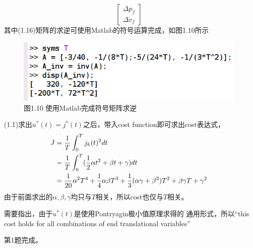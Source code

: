\documentclass[40pt,a4paper,UTF8]{ctexart}
\numberwithin{equation}{section}
\begin{document}
\begin{enumerate}
\begin{enumerate}
\begin{equation}
    \begin{bmatrix}
        \Delta p_f \\ \Delta v_f
    \end{bmatrix}
\end{equation}
其中(1.16)矩阵的求逆可使用Matlab的符号运算完成，如图1.10所示
\begin{figure}[H]
    \centering
    \includegraphics[width=4.8in]{ch4_10.png} {图1.10 使用Matlab完成符号矩阵求逆}
\end{figure}
\end{enumerate}

(1.1)求出$u^*(t)=j^*(t)$之后，带入cost function即可求出cost表达式，
\begin{align}
    J&=\frac{1}{T}\int_{0}^{T}{j_k(t)^2dt} \notag \\
     &=\frac{1}{T}\int_{0}^{T}({\frac{1}{2}\alpha t^2+\beta t+\gamma})dt \notag \\
     &=\frac{1}{20}\alpha^2T^4+\frac{1}{4}\alpha\beta T^3+\frac{1}{3}(\alpha \gamma + \beta^2)T^2 + \beta \gamma T + \gamma^2
\end{align}
由于前面求出的$        \alpha , \beta ,\gamma$均只与$T$相关，所以cost也仅与$T$相关。

需要指出，由于$u^*(t)$是使用Pontryagin极小值原理求得的
通用形式，所以“this cost holds for all combinations of end translational variables”\cite{ref1}


第1题完成。
\end{enumerate}
\end{document}
